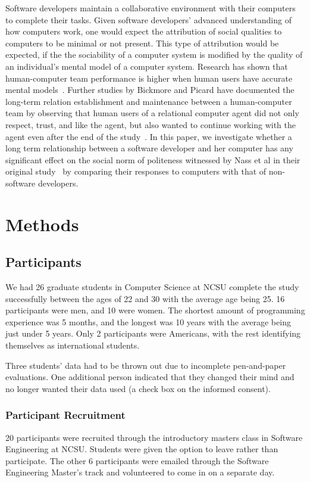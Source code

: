 \documentclass{sig-alternate-05-2015}
\begin{document}
Software developers maintain a collaborative environment with their computers to complete their tasks. Given software developers' advanced understanding of how computers work, one would expect the attribution of social qualities to computers to be minimal or not present.  This type of attribution would be expected, if the the sociability of a computer system is modified by the quality of an individual's mental model of a computer system. Research has shown that human-computer team performance is higher when human users have accurate mental models~\cite{wilkison2007effects}. Further studies by Bickmore and Picard have documented the long-term relation establishment and maintenance between a human-computer team by observing that human users of a relational computer agent did not only respect, trust, and like the agent, but also wanted to continue working with the agent even after the end of the study~\cite{Bickmore:2005:EML:1067860.1067867}. In this paper, we investigate whether a long term relationship between a software developer and her computer has any significant effect on the social norm of politeness witnessed by Nass et al in their original study~\cite{nass1999people} by comparing their responses to computers with that of non-software developers.

\section{Methods}

\subsection{Participants}
 We had 26 graduate students in Computer Science at NCSU complete the study successfully between the ages of 22 and 30  with the average age being 25.  16 participants were men, and 10 were women.  The shortest amount of programming experience was 5 months, and the longest was 10 years with the average being just under 5 years.  Only 2 participants were Americans, with the rest identifying themselves as international students.  
 
 Three students' data had to be thrown out due to incomplete pen-and-paper evaluations.  One additional person indicated that they changed their mind and no longer wanted their data used (a check box on the informed consent).\\  
 
 
 \subsubsection{Participant Recruitment} 20 participants were recruited through the introductory masters class in Software Engineering at NCSU.   Students were given the option to leave rather than participate.  The other 6 participants were emailed through the Software Engineering Master's track and volunteered to come in on a separate day. 
 
\end{document}
